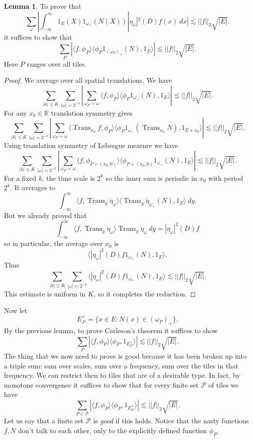 \documentclass[12pt]{report}
\newcommand{\RR}{\mathbb{R}}
\DeclareMathOperator*{\Trans}{Trans}
\newcommand{\dfn}[1]{\emph{#1}\index{#1}}
\theoremstyle{definition}
\newtheorem{lemma}[theorem]{Lemma}
\begin{document}
\begin{lemma}
To prove that
$$\sum_\omega |\int_{-\infty}^\infty 1_E(X)1_{\omega_+}(N(X))|\eta_\omega|^2(D)f(x) ~dx| \lesssim ||f||_2 \sqrt{|E|}.$$
it suffices to show that
$$\sum_P |\langle f, \phi_P\rangle\langle \phi_P 1_{(\omega_P)_+}(N), 1_E\rangle| \lesssim ||f||_2\sqrt{|E|}.$$
Here $P$ ranges over all tiles.
\end{lemma}
\begin{proof}
We average over all spatial translations. We have
$$\sum_{|k| \leq K} \sum_{|\omega|=2^{-k}} |\sum_{\omega_P = \omega} \langle f, \phi_P\rangle \langle \phi_P 1_{\omega_+}(N), 1_E\rangle| \lesssim ||f||_2\sqrt{|E|}.$$
For any $x_0 \in \RR$ translation symmetry gives
$$\sum_{|k| \leq K} \sum_{|\omega|=2^{-k}} |\sum_{\omega_P = \omega} \langle \Trans_{x_0} f, \phi_P\rangle \langle \phi_P 1_{\omega_+}(\Trans_{x_0}N), 1_{E+x_0}\rangle| \lesssim ||f||_2 \sqrt{|E|}.$$
Using translation symmetry of Lebesgue measure we have
$$\sum_{|k| \leq K} \sum_{|\omega|=2^{-k}} |\sum_{\omega_P = \omega} \langle f, \phi_{P+(x_0, 0)}\rangle \langle \phi_{P+(x_0,0)} 1_{\omega_+}(N), 1_E\rangle| \lesssim ||f||_2 \sqrt{|E|}.$$
For a fixed $k$, the time scale is $2^k$ so the inner sum is periodic in $x_0$ with period $2^k$.
It averages to
$$\int_{-\infty}^\infty \langle f, \Trans_y \check \eta_\omega \rangle\langle \Trans_y \check \eta_{\omega_+}(N), 1_E\rangle ~dy.$$
But we already proved that
$$\int_{-\infty}^\infty \langle f, \Trans_y \check \eta_\omega \rangle \Trans_y \check \eta_\omega ~dy = |\eta_\omega|^2(D)f$$
so in particular, the average over $x_0$ is
$$\langle |\eta_\omega|^2(D) f1_{\omega_+}(N), 1_E\rangle.$$
Thus
$$\sum_{|k| \leq K} \sum_{|\omega|=2^{-k}} \langle |\eta_\omega|^2(D) f1_{\omega_+}(N), 1_E\rangle \lesssim ||f||_2 \sqrt{|E|}.$$
This estimate is uniform in $K$, so it completes the reduction.
\end{proof}
Now let
$$E_P^+ = \{x \in E: N(x) \in (\omega_P)_+\}.$$
By the previous lemma, to prove Carleson's theorem it suffices to show
$$\sum_P |\langle f, \phi_P\rangle \langle \phi_P, 1_{E_P^+}\rangle| \lesssim ||f||_2 \sqrt{|E|}.$$
The thing that we now need to prove is good because it has been broken up into a triple sum: sum over scales, sum over a frequency, sum over the tiles in that frequency.
We can restrict then to tiles that are of a desirable type.
In fact, by monotone convergence it suffices to show that for every finite set $\mathcal P$ of tiles we have
$$\sum_{P \in \mathcal P} |\langle f, \phi_P\rangle \langle \phi_P, 1_{E_P^+}\rangle| \lesssim ||f||_2 \sqrt{|E|}.$$
Let us say that a finite set $\mathcal P$ is \dfn{good} if this holds.
Notice that the nasty functions $f,N$ don't talk to each other, only to the explicitly defined function $\phi_P$.
\end{document}
